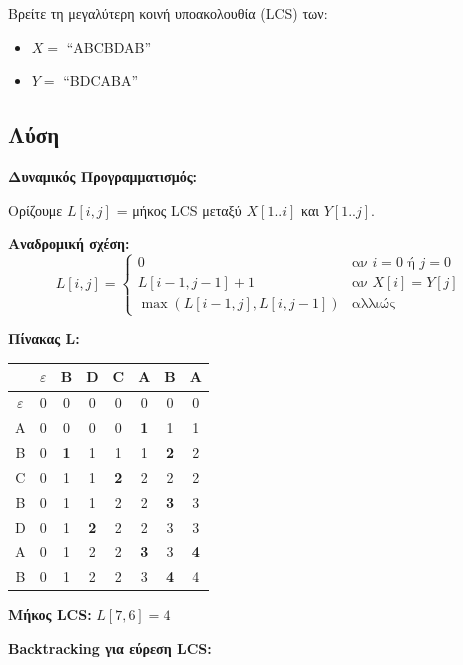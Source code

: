 \begin{formulabox}[Εκφώνηση]
Βρείτε τη μεγαλύτερη κοινή υποακολουθία (LCS) των:
\begin{itemize}
    \item $X = $ ``ABCBDAB''
    \item $Y = $ ``BDCABA''
\end{itemize}
\end{formulabox}

\subsection*{Λύση}

\textbf{Δυναμικός Προγραμματισμός:}

Ορίζουμε $L[i,j]$ = μήκος LCS μεταξύ $X[1..i]$ και $Y[1..j]$.

\textbf{Αναδρομική σχέση:}
$$L[i,j] = \begin{cases}
0 & \text{αν } i = 0 \text{ ή } j = 0 \\
L[i-1,j-1] + 1 & \text{αν } X[i] = Y[j] \\
\max(L[i-1,j], L[i,j-1]) & \text{αλλιώς}
\end{cases}$$

\textbf{Πίνακας L:}

\begin{center}
\begin{tabular}{c|ccccccc}
 & $\varepsilon$ & B & D & C & A & B & A \\
\hline
$\varepsilon$ & 0 & 0 & 0 & 0 & 0 & 0 & 0 \\
A & 0 & 0 & 0 & 0 & \textbf{1} & 1 & 1 \\
B & 0 & \textbf{1} & 1 & 1 & 1 & \textbf{2} & 2 \\
C & 0 & 1 & 1 & \textbf{2} & 2 & 2 & 2 \\
B & 0 & 1 & 1 & 2 & 2 & \textbf{3} & 3 \\
D & 0 & 1 & \textbf{2} & 2 & 2 & 3 & 3 \\
A & 0 & 1 & 2 & 2 & \textbf{3} & 3 & \textbf{4} \\
B & 0 & 1 & 2 & 2 & 3 & \textbf{4} & 4 \\
\end{tabular}
\end{center}

\textbf{Μήκος LCS:} $L[7,6] = 4$

\textbf{Backtracking για εύρεση LCS:}

